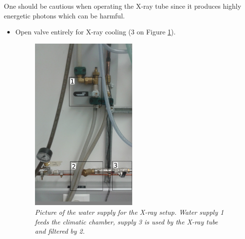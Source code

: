 \documentclass[a4paper,12pt,twoside]{article}
\begin{document}
One should be cautious when operating the X-ray tube since it produces highly energetic photons which can be harmful. 

\begin{itemize}
\item {Open valve entirely for X-ray cooling (3 on Figure \ref{Water}).
\begin{figure} [h!] \centering
\includegraphics[width=0.5\textwidth, angle=0] {./Figures/Water2.jpg}
\caption{\em  \label{Water}
Picture of the water supply for the X-ray setup. Water supply 1 feeds the climatic chamber, supply 3 is used by the X-ray tube and filtered by 2.}
\end{figure}
}


\end{itemize}
\end{document}
